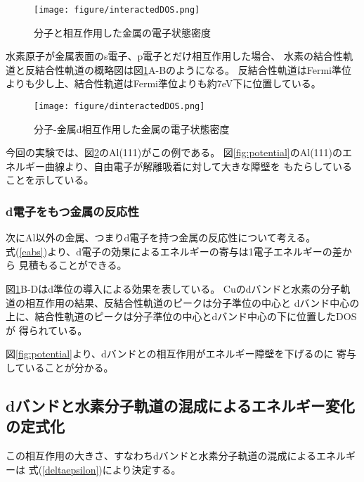\documentclass[12pt]{ltjsarticle}
\begin{document}
\begin{figure}[hbtp]
    \begin{center}
     \texttt{[image: figure/interactedDOS.png]}
    \end{center}
    \caption{分子と相互作用した金属の電子状態密度}
    \label{fig:interactedDOS}
\end{figure}

水素原子が金属表面のs電子、p電子とだけ相互作用した場合、
水素の結合性軌道と反結合性軌道の概略図は図\ref{fig:interactedDOS}A-Bのようになる。
反結合性軌道はFermi準位よりも少し上、結合性軌道はFermi準位よりも約7eV下に位置している。

\begin{figure}[hbtp]
    \begin{center}
     \texttt{[image: figure/dinteractedDOS.png]}
    \end{center}
    \caption{分子-金属d相互作用した金属の電子状態密度}
    \label{fig:dinteractedDOS}
\end{figure}

今回の実験では、図\ref{fig:dinteractedDOS}のAl(111)がこの例である。
図\ref{fig:potential}のAl(111)のエネルギー曲線より、自由電子が解離吸着に対して大きな障壁を
もたらしていることを示している。\cite{Mysyrowicz1993}

\subsubsection{d電子をもつ金属の反応性}
次にAl以外の金属、つまりd電子を持つ金属の反応性について考える。\\
式(\ref{eabs})より、d電子の効果によるエネルギーの寄与は1電子エネルギーの差から
見積もることができる。

図\ref{fig:interactedDOS}B-Dはd準位の導入による効果を表している。
Cuのdバンドと水素の分子軌道の相互作用の結果、反結合性軌道のピークは分子準位の中心と
dバンド中心の上に、結合性軌道のピークは分子準位の中心とdバンド中心の下に位置したDOSが
得られている。

図\ref{fig:potential}より、dバンドとの相互作用がエネルギー障壁を下げるのに
寄与していることが分かる。

\subsection{dバンドと水素分子軌道の混成によるエネルギー変化の定式化}
この相互作用の大きさ、すなわちdバンドと水素分子軌道の混成によるエネルギーは
式(\ref{deltaepsilon})により決定する。
\end{document}
